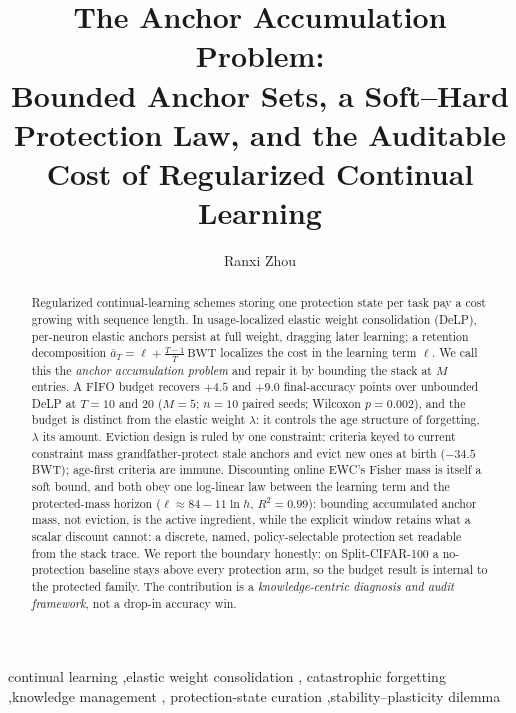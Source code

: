 \documentclass[review,12pt,number]{elsarticle}
\newcommand{\delp}{DeLP}
\begin{document}
\linenumbers

\begin{frontmatter}

\title{The Anchor Accumulation Problem:\\Bounded Anchor Sets, a Soft--Hard
Protection Law, and the Auditable Cost of Regularized Continual Learning}

\author[hnucm]{Ranxi Zhou}
\address[hnucm]{Hunan University of Chinese Medicine, 300 Xueshi Avenue,
Hanpu, Yuelu District, Changsha 410208, Hunan, China}

\begin{abstract}
Regularized continual-learning schemes storing one protection state
per task pay a cost growing with sequence length. In usage-localized
elastic weight consolidation (\delp{}), per-neuron elastic anchors
persist at full weight, dragging later learning; a retention
decomposition $\bar a_T = \ell + \frac{T-1}{T}\,\mathrm{BWT}$ localizes
the cost in the learning term $\ell$. We call this the
\emph{anchor accumulation problem} and repair it by bounding the stack at
$M$ entries. A FIFO budget recovers $+4.5$ and $+9.0$ final-accuracy
points over unbounded \delp{} at $T{=}10$ and $20$ ($M{=}5$;
$n{=}10$ paired seeds; Wilcoxon $p{=}0.002$), and the budget is distinct
from the elastic weight $\lambda$: it controls the age structure of
forgetting, $\lambda$ its amount. Eviction design is ruled by one
constraint: criteria keyed to current constraint mass
grandfather-protect stale anchors and evict new ones at birth
($-34.5$ BWT); age-first criteria are immune. Discounting online EWC's
Fisher mass is itself a soft bound, and both obey one log-linear law
between the learning term and the protected-mass horizon
($\ell \approx 84 - 11\ln h$, $R^2{=}0.99$): bounding accumulated anchor
mass, not eviction, is the active ingredient, while the explicit window
retains what a scalar discount cannot: a discrete, named,
policy-selectable protection set readable from the stack trace. We
report the boundary honestly: on Split-CIFAR-100 a no-protection
baseline stays above every protection arm, so the budget result is
internal to the protected family. The contribution is a
\emph{knowledge-centric diagnosis and audit framework}, not a drop-in
accuracy win.
\end{abstract}

\begin{keyword}
continual learning \sep elastic weight consolidation \sep
catastrophic forgetting \sep knowledge management \sep
protection-state curation \sep stability--plasticity dilemma
\end{keyword}

\end{frontmatter}
\end{document}
